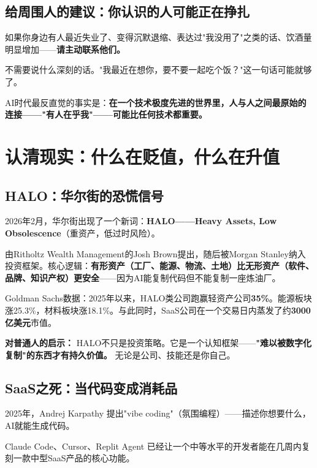 \documentclass[a4paper,12pt,UTF8]{ctexart}
\begin{document}
\subsection{给周围人的建议：你认识的人可能正在挣扎}

如果你身边有人最近失业了、变得沉默退缩、表达过"我没用了"之类的话、饮酒量明显增加——\textbf{请主动联系他们。}

不需要说什么深刻的话。"我最近在想你，要不要一起吃个饭？"这一句话可能就够了。

AI时代最反直觉的事实是：\textbf{在一个技术极度先进的世界里，人与人之间最原始的连接——"有人在乎我"——可能比任何技术都重要。}

\section{认清现实：什么在贬值，什么在升值}

\subsection{HALO：华尔街的恐慌信号}

2026年2月，华尔街出现了一个新词：\textbf{HALO——Heavy Assets, Low Obsolescence}（重资产，低过时风险）。

由Ritholtz Wealth Management的Josh Brown提出，随后被Morgan Stanley纳入投资框架。核心逻辑：\textbf{有形资产（工厂、能源、物流、土地）比无形资产（软件、品牌、知识产权）更安全}——因为AI能复制代码但不能复制一座炼油厂。

Goldman Sachs数据：2025年以来，HALO类公司跑赢轻资产公司\textbf{35\%}。能源板块涨25.3\%，材料板块涨18.1\%。与此同时，SaaS公司在一个交易日内蒸发了约\textbf{3000亿美元}市值。

\textbf{对普通人的启示：} HALO不只是投资策略。它是一个认知框架——\textbf{"难以被数字化复制"的东西才有持久价值。} 无论是公司、技能还是你自己。

\subsection{SaaS之死：当代码变成消耗品}

2025年，Andrej Karpathy 提出"vibe coding"（氛围编程）——描述你想要什么，AI就能生成代码。

Claude Code、Cursor、Replit Agent 已经让一个中等水平的开发者能在几周内复刻一款中型SaaS产品的核心功能。
\end{document}
